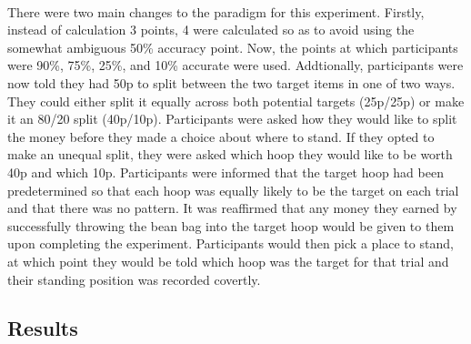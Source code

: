 \documentclass[12pt]{article}
\begin{document}
\paragraph{} There were two main changes to the paradigm for this experiment. Firstly, instead of calculation 3 points, 4 were calculated so as to avoid using the somewhat ambiguous 50\% accuracy point. Now, the points at which participants were 90\%, 75\%, 25\%, and 10\% accurate were used. Addtionally, participants were now told they had 50p to split between the two target items in one of two ways. They could either split it equally across both potential targets (25p/25p) or make it an 80/20 split (40p/10p). Participants were asked how they would like to split the money before they made a choice about where to stand. If they opted to make an unequal split, they were asked which hoop they would like to be worth 40p and which 10p. Participants were informed that the target hoop had been predetermined so that each hoop was equally likely to be the target on each trial and that there was no pattern. It was reaffirmed that any money they earned by successfully throwing the bean bag into the target hoop would be given to them upon completing the experiment. Participants would then pick a place to stand, at which point they would be told which hoop was the target for that trial and their standing position was recorded covertly. 


\subsection*{Results}
\end{document}
